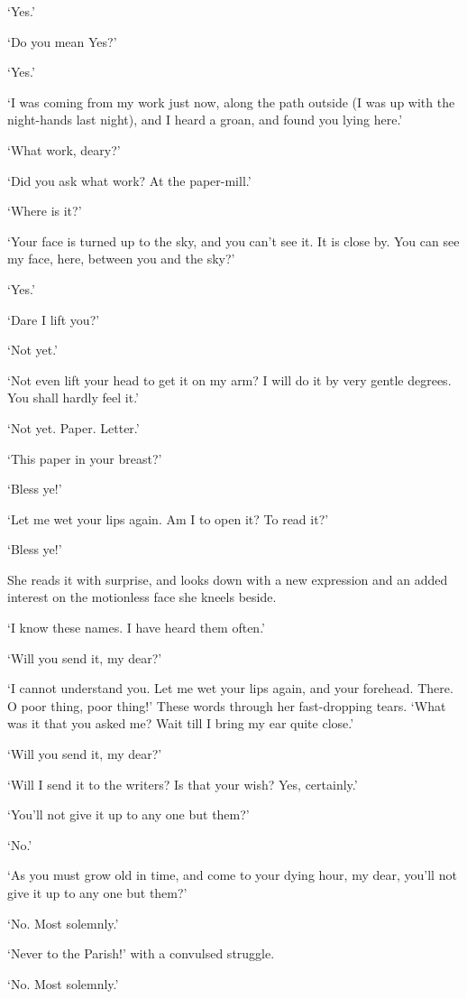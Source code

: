 ‘Yes.’

‘Do you mean Yes?’

‘Yes.’

‘I was coming from my work just now, along the path outside (I was up
with the night-hands last night), and I heard a groan, and found you
lying here.’

‘What work, deary?’

‘Did you ask what work? At the paper-mill.’

‘Where is it?’

‘Your face is turned up to the sky, and you can’t see it. It is close
by. You can see my face, here, between you and the sky?’

‘Yes.’

‘Dare I lift you?’

‘Not yet.’

‘Not even lift your head to get it on my arm? I will do it by very
gentle degrees. You shall hardly feel it.’

‘Not yet. Paper. Letter.’

‘This paper in your breast?’

‘Bless ye!’

‘Let me wet your lips again. Am I to open it? To read it?’

‘Bless ye!’

She reads it with surprise, and looks down with a new expression and an
added interest on the motionless face she kneels beside.

‘I know these names. I have heard them often.’

‘Will you send it, my dear?’

‘I cannot understand you. Let me wet your lips again, and your forehead.
There. O poor thing, poor thing!’ These words through her fast-dropping
tears. ‘What was it that you asked me? Wait till I bring my ear quite
close.’

‘Will you send it, my dear?’

‘Will I send it to the writers? Is that your wish? Yes, certainly.’

‘You’ll not give it up to any one but them?’

‘No.’

‘As you must grow old in time, and come to your dying hour, my dear,
you’ll not give it up to any one but them?’

‘No. Most solemnly.’

‘Never to the Parish!’ with a convulsed struggle.

‘No. Most solemnly.’

